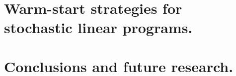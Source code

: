 \documentclass[phd,leftchapter]{msthesis}
\begin{document}
\chapter[Warm-start strategies for stochastic linear programs.]{Warm-start strategies for \\stochastic linear programs.}


\chapter{Conclusions and future research.}


%
%
%



%
%
\end{document}
